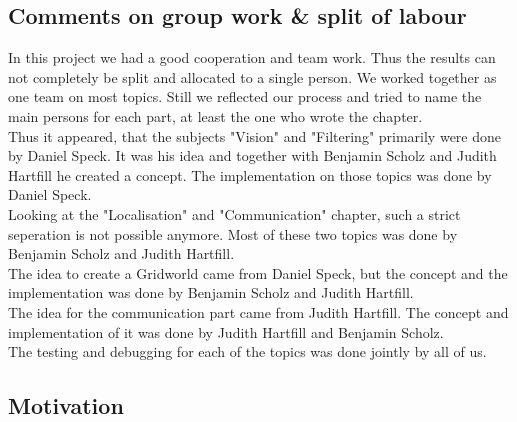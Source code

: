 \documentclass[lnicst,a4paper]{svmultln}
\begin{document}
\subsection{Comments on group work \& split of labour}
In this project we had a good cooperation and team work. Thus the results can not completely be split and allocated to a single person. We worked together as one team on most topics. Still we reflected our process and tried to name the main persons for each part, at least the one who wrote the chapter.
\\
Thus it appeared, that the subjects "Vision" and "Filtering" primarily were done by Daniel Speck. It was his idea and together with Benjamin Scholz and Judith Hartfill he created a concept. The implementation on those topics was done by Daniel Speck.
\\
Looking at the "Localisation" and "Communication" chapter, such a strict seperation is not possible anymore. Most of these two topics was done by Benjamin Scholz and Judith Hartfill.
\\
The idea to create a Gridworld came from Daniel Speck, but the concept and the implementation was done by Benjamin Scholz and Judith Hartfill.
\\
The idea for the communication part came from Judith Hartfill. The concept and implementation of it was done by Judith Hartfill and Benjamin Scholz. 
\\
The testing and debugging for each of the topics was done jointly by all of us.






\subsection{Motivation}
\end{document}
